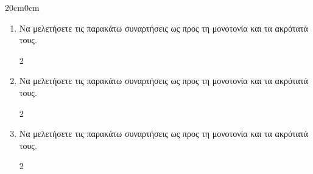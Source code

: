 \documentclass[twoside,nofonts,ektypwsh]{frontisthrio-ask}
\begin{document}
\begin{adjmulticols}{2}{0cm}{0cm}
\begin{enumerate}
\item Να μελετήσετε τις παρακάτω συναρτήσεις ως προς τη μονοτονία και τα ακρότατά τους.
\begin{multicols}{2}
\end{multicols}
\item Να μελετήσετε τις παρακάτω συναρτήσεις ως προς τη μονοτονία και τα ακρότατά τους.
\begin{multicols}{2}
\end{multicols}
\item Να μελετήσετε τις παρακάτω συναρτήσεις ως προς τη μονοτονία και τα ακρότατά τους.
\begin{multicols}{2}
\end{multicols}
\end{enumerate}
\end{adjmulticols}
\end{document}
